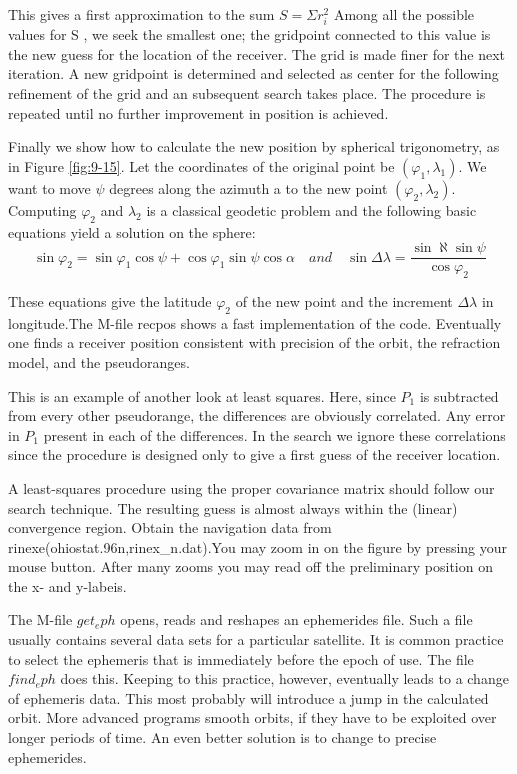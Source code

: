 	This gives a first approximation to the sum $S=\Sigma r^2_i$ Among all the possible values for S , we seek the smallest one; the gridpoint connected to this value is the new guess for the location of the receiver. The grid is made finer for the next iteration. A new gridpoint is determined and selected as center for the following refinement of the grid and
	an subsequent search takes place. The procedure is repeated until no further improvement in position is achieved.
	
	Finally we show how to calculate the new position by spherical trigonometry, as in Figure \ref{fig:9-15}. Let the coordinates of the original point be $(\varphi_1,\lambda_1)$. We want to move $\psi$ degrees along the azimuth a to the new point $(\varphi_2,\lambda_2)$. Computing $\varphi_2$ and $\lambda_2$ is a classical geodetic problem and the following basic equations yield a solution on the sphere:
	\begin{equation}\label{eq:9.32}
		\sin\varphi_2 = \sin\varphi_1\cos\psi+\cos\varphi_1\sin\psi\cos\alpha\quad and \quad \sin\Delta\lambda=\dfrac{\sin\aleph\sin\psi}{\cos\varphi_2}
	\end{equation}
	
	These equations give the latitude $\varphi_2$ of the new point and the increment $\Delta\lambda$ in longitude.The M-file recpos shows a fast implementation of the code. Eventually one finds a receiver position consistent with precision of the orbit, the refraction model, and the pseudoranges.
	
	This is an example of another look at least squares. Here, since $P_1$ is subtracted from every other pseudorange, the differences are obviously correlated. Any error in $P_1$ present in each of the differences. In the search we ignore these correlations since the procedure is designed only to give a first guess of the receiver location.
	
	A least-squares procedure using the proper covariance matrix should follow our search technique. The resulting guess is almost always within the (linear) convergence region. Obtain the navigation data from rinexe(ohiostat.96n,rinex\_n.dat).You may zoom in on the figure by pressing your mouse button. After many zooms you may read off the preliminary position on the x- and y-labeis.
	
	The M-file $get_eph$ opens, reads and reshapes an ephemerides file. Such a file usually contains several data sets for a particular satellite. It is common practice to select the ephemeris that is immediately before the epoch of use. The file $find_eph$ does this. Keeping to this practice, however, eventually leads to a change of ephemeris data. This most probably will introduce a jump in the calculated orbit. More advanced programs smooth orbits, if they have to be exploited over longer periods of time. An even better solution is to change to precise ephemerides.
